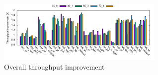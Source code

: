 \vspace{-0.7cm}
	\begin{figure}[h]
		\centering
		\includegraphics[width=\textwidth,height=3cm]{figures/mov_thrpt.png}
		\caption{Overall throughput improvement}
		\label{fig:corun_thrpt}
		\vspace{-1.3cm}
	\end{figure}
